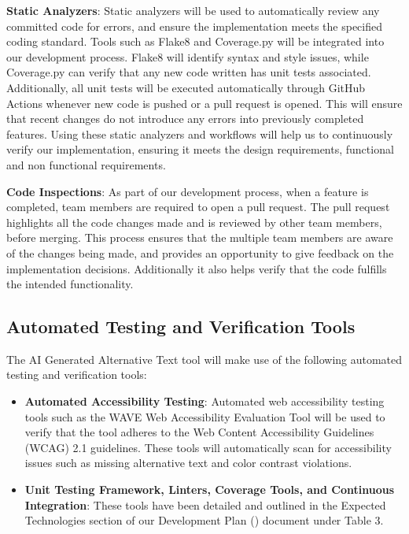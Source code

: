 \documentclass[12pt, titlepage]{article}
\begin{document}
\textbf{Static Analyzers}:
Static analyzers will be used to automatically review any committed
code for errors, and ensure the implementation meets the specified
coding standard.
Tools such as Flake8 and Coverage.py will be integrated into our
development process. Flake8 will identify syntax and style issues,
while Coverage.py can verify that any new code written has unit tests
associated.
Additionally, all unit tests will be executed automatically through
GitHub Actions whenever new code is pushed or a pull request is
opened. This will ensure that recent changes do not introduce any
errors into previously completed features.
Using these static analyzers and workflows will help us to
continuously verify our implementation, ensuring it meets the design
requirements, functional and non functional requirements.

\textbf{Code Inspections}:
As part of our development process, when a feature is completed, team
members are required to open a pull request. The pull request
highlights all the code changes made and is reviewed by other team
members, before merging.
This process ensures that the multiple team members are aware of the
changes being made, and provides an opportunity to give feedback on
the implementation decisions. Additionally it also helps verify that
the code fulfills the intended functionality.

\subsection{Automated Testing and Verification Tools}
The AI Generated Alternative Text tool will make use of the following
automated testing and verification tools:
\begin{itemize}
  \item \textbf{Automated Accessibility Testing}: Automated web
    accessibility testing tools such as the WAVE Web Accessibility
    Evaluation Tool will be used to
    verify that the tool adheres to the Web Content Accessibility
    Guidelines (WCAG) 2.1 guidelines. These tools will automatically
    scan for accessibility issues such as missing alternative text
    and color contrast violations.
  \item \textbf{Unit Testing Framework, Linters, Coverage Tools, and
    Continuous Integration}: These tools have been detailed and
    outlined in the Expected Technologies section
    of our Development Plan (\citet{DP}) document under Table 3.
\end{itemize}
\end{document}
